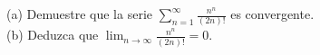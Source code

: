 \item (a) Demuestre que la serie $\displaystyle\sum_{n=1}^\infty \frac{n^n}{(2n)!}$ es convergente. \\
    (b) Deduzca que $\displaystyle\lim_{n \to \infty} \frac{n^n}{(2n)!} = 0$.
